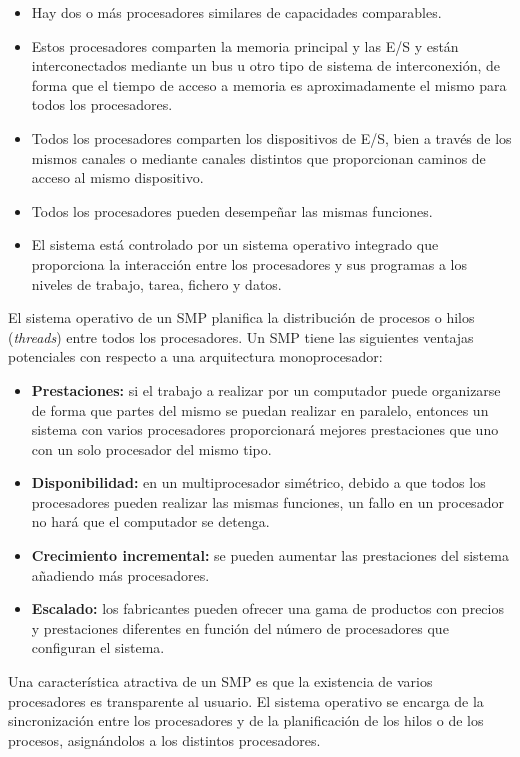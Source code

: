 \begin{itemize}
  \item Hay dos o más procesadores similares de capacidades comparables.
  \item Estos procesadores comparten la memoria principal y las E/S y están interconectados mediante un bus u otro tipo de sistema de interconexión, de forma que el tiempo de acceso a memoria es aproximadamente el mismo para todos los procesadores.
  \item Todos los procesadores comparten los dispositivos de E/S, bien a través de los mismos canales o mediante canales distintos que proporcionan caminos de acceso al mismo dispositivo.
  \item Todos los procesadores pueden desempeñar las mismas funciones.
  \item El sistema está controlado por un sistema operativo integrado que proporciona la interacción entre los procesadores y sus programas a los niveles de trabajo, tarea, fichero y datos.
\end{itemize}

El sistema operativo de un SMP planifica la distribución de procesos o hilos (\textit{threads}) entre todos los procesadores. Un SMP tiene las siguientes ventajas potenciales con respecto a una arquitectura monoprocesador:

\begin{itemize}
  \item \textbf{Prestaciones:} si el trabajo a realizar por un computador puede organizarse de forma que partes del mismo se puedan realizar en paralelo, entonces un sistema con varios procesadores proporcionará mejores prestaciones que uno con un solo procesador del mismo tipo.
  \item \textbf{Disponibilidad:} en un multiprocesador simétrico, debido a que todos los procesadores pueden realizar las mismas funciones, un fallo en un procesador no hará que el computador se detenga.
  \item \textbf{Crecimiento incremental:} se pueden aumentar las prestaciones del sistema añadiendo más procesadores.
  \item \textbf{Escalado:} los fabricantes pueden ofrecer una gama de productos con precios y prestaciones diferentes en función del número de procesadores que configuran el sistema.
\end{itemize}

Una característica atractiva de un SMP es que la existencia de varios procesadores es transparente al usuario. El sistema operativo se encarga de la sincronización entre los procesadores y de la planificación de los hilos o de los procesos, asignándolos a los distintos procesadores.

